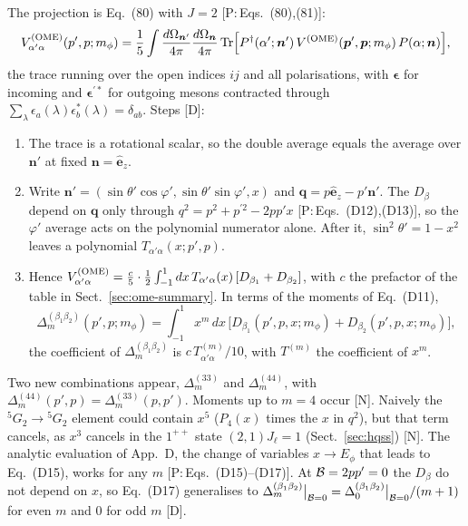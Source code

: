 \documentclass[11pt,a4paper]{article}
\newcommand{\tagP}[1]{\textcolor{blue!65!black}{\textsf{\small[P:\,#1]}}}
\newcommand{\tagD}{\textcolor{orange!85!black}{\textsf{\small[D]}}}
\newcommand{\tagN}{\textcolor{red!70!black}{\textsf{\small[N]}}}
\newcommand{\VOME}{V^{\rm (OME)}}
\newcommand{\D}[2]{\Delta^{(#1)}_{#2}}
\newcommand{\vq}{\bm q}
\newcommand{\vn}{\bm n}
\newcommand{\veps}{\bm\epsilon}
\begin{document}
The projection is Eq.~(80) with $J=2$ \tagP{Eqs.~(80),(81)}:
\begin{equation}
\VOME_{\alpha'\alpha}(p',p;m_\phi)=\frac15\int\frac{d\Omega_{\vn'}}{4\pi}\frac{d\Omega_{\vn}}{4\pi}\,{\rm Tr}\Big[P^\dagger(\alpha';\vn')\,\VOME(\bm p',\bm p;m_\phi)\,P(\alpha;\vn)\Big],
\end{equation}
the trace running over the open indices $ij$ and all polarisations, with $\veps$ for incoming and $\veps^{\prime*}$ for outgoing mesons contracted through $\sum_\lambda\epsilon_a(\lambda)\epsilon^*_b(\lambda)=\delta_{ab}$. Steps \tagD:
\begin{enumerate}
\item The trace is a rotational scalar, so the double average equals the average over $\vn'$ at fixed $\vn=\hat{\bm e}_z$.
\item Write $\vn'=(\sin\theta'\cos\varphi',\sin\theta'\sin\varphi',x)$ and $\vq=p\hat{\bm e}_z-p'\vn'$. The $D_\beta$ depend on $\vq$ only through $q^2=p^2+p^{\prime2}-2pp'x$ \tagP{Eqs.~(D12),(D13)}, so the $\varphi'$ average acts on the polynomial numerator alone. After it, $\sin^2\theta'=1-x^2$ leaves a polynomial $T_{\alpha'\alpha}(x;p',p)$.
\item Hence $\VOME_{\alpha'\alpha}=\frac{c}{5}\cdot\frac12\int_{-1}^1dx\,T_{\alpha'\alpha}(x)\,[D_{\beta_1}+D_{\beta_2}]$, with $c$ the prefactor of the table in Sect.~\ref{sec:ome-summary}. In terms of the moments of Eq.~(D11),
\begin{equation}
\D{\beta_1\beta_2}{m}(p',p;m_\phi)=\int_{-1}^1x^m\,dx\,\big[D_{\beta_1}(p',p,x;m_\phi)+D_{\beta_2}(p',p,x;m_\phi)\big],
\label{eq:Delta}
\end{equation}
the coefficient of $\D{\beta_1\beta_2}{m}$ is $c\,T^{(m)}_{\alpha'\alpha}/10$, with $T^{(m)}$ the coefficient of $x^m$.
\end{enumerate}
Two new combinations appear, $\D{33}{m}$ and $\D{44}{m}$, with $\D{44}{m}(p',p)=\D{33}{m}(p,p')$. Moments up to $m=4$ occur \tagN. Naively the $^5G_2\to{}^5G_2$ element could contain $x^5$ ($P_4(x)$ times the $x$ in $q^2$), but that term cancels, as $x^3$ cancels in the $1^{++}$ state $(2,1)J_\ell{=}1$ (Sect.~\ref{sec:hqss}) \tagN. The analytic evaluation of App.~D, the change of variables $x\to E_\phi$ that leads to Eq.~(D15), works for any $m$ \tagP{Eqs.~(D15)--(D17)}. At ${\cal B}=2pp'=0$ the $D_\beta$ do not depend on $x$, so Eq.~(D17) generalises to $\D{\beta_1\beta_2}{m}\big|_{{\cal B}=0}=\D{\beta_1\beta_2}{0}\big|_{{\cal B}=0}/(m+1)$ for even $m$ and $0$ for odd $m$ \tagD.
\end{document}
